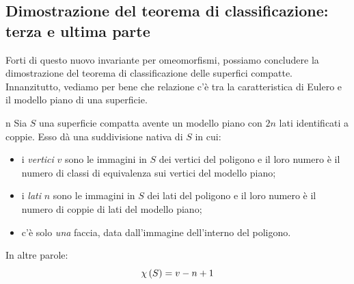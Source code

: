 \subsection{Dimostrazione del teorema di classificazione: terza e ultima parte}
Forti di questo nuovo invariante per omeomorfismi, possiamo concludere la dimostrazione del teorema di classificazione delle superfici compatte. Innanzitutto, vediamo per bene che relazione c'è tra la caratteristica di Eulero e il modello piano di una superficie.
\begin{remark}{n}
	Sia $S$ una superficie compatta avente un modello piano con $2n$ lati identificati a coppie. Esso dà una suddivisione nativa di $S$ in cui:
	\begin{itemize}
		\item i \textit{vertici} $v$ sono le immagini in $S$ dei vertici del poligono e il loro numero è il numero di classi di equivalenza sui vertici del modello piano;
		\item i \textit{lati} $n$ sono le immagini in $S$ dei lati del poligono  e il loro numero è il numero di coppie di lati del modello piano;
		\item c'è solo \textit{una} faccia, data dall'immagine dell'interno del poligono.
	\end{itemize}
In altre parole:
\begin{equation*}
	\euler{S}{\ }=v-n+1
\end{equation*}
\end{remark}
